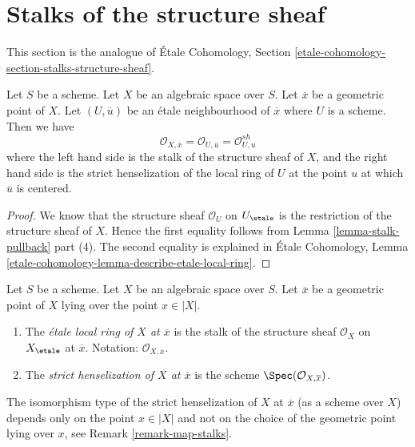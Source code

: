 \section{Stalks of the structure sheaf}
\label{section-stalks-structure-sheaf}

\noindent
This section is the analogue of
\'Etale Cohomology, Section
\ref{etale-cohomology-section-stalks-structure-sheaf}.

\begin{lemma}
\label{lemma-describe-etale-local-ring}
Let $S$ be a scheme.
Let $X$ be an algebraic space over $S$.
Let $\overline{x}$ be a geometric point of $X$.
Let $(U, \overline{u})$ be an \'etale neighbourhood of $\overline{x}$
where $U$ is a scheme. Then we have
$$
\mathcal{O}_{X, \overline{x}} =
\mathcal{O}_{U, \overline{u}} =
\mathcal{O}_{U, u}^{sh}
$$
where the left hand side is the stalk of the structure sheaf of $X$,
and the right hand side is the strict henselization of the local ring
of $U$ at the point $u$ at which $\overline{u}$ is centered.
\end{lemma}

\begin{proof}
We know that the structure sheaf $\mathcal{O}_U$ on
$U_\etale$ is the restriction of the structure sheaf of $X$.
Hence the first equality follows from
Lemma \ref{lemma-stalk-pullback} part (4).
The second equality is explained in
\'Etale Cohomology,
Lemma \ref{etale-cohomology-lemma-describe-etale-local-ring}.
\end{proof}

\begin{definition}
\label{definition-etale-local-rings}
Let $S$ be a scheme.
Let $X$ be an algebraic space over $S$.
Let $\overline{x}$ be a geometric point of $X$ lying over the point
$x \in |X|$.
\begin{enumerate}
\item The {\it \'etale local ring of $X$ at $\overline{x}$}
is the stalk of the structure sheaf $\mathcal{O}_X$ on $X_\etale$
at $\overline{x}$.
Notation: $\mathcal{O}_{X, \overline{x}}$.
\item The {\it strict henselization of $X$ at $\overline{x}$}
is the scheme $\Spec(\mathcal{O}_{X, \overline{x}})$.
\end{enumerate}
\end{definition}

\noindent
The isomorphism type of the strict henselization of $X$ at $\overline{x}$
(as a scheme over $X$) depends only on the point $x \in |X|$ and not on
the choice of the geometric point lying over $x$, see
Remark \ref{remark-map-stalks}.

